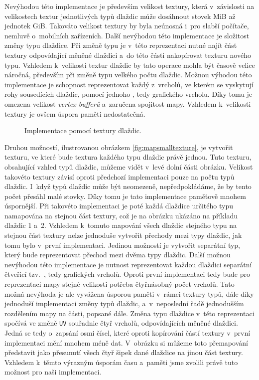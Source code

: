Nevýhodou této implementace je především velikost textury, která v~závislosti na velikostech textur jednotlivých typů dlaždic může dosáhnout stovek MiB až jednotek GiB. Takováto velikost textury by byla neúnosná i~pro slabší počítače, nemluvě o~mobilních zařízeních. Další nevýhodou této implementace je složitost změny typu dlaždice. Při změně typu je v~této reprezentaci nutné najít část textury odpovídající měněné dlaždici a~do této části nakopírovat texturu nového typu. Vzhledem k~velikosti textur dlaždic by tato operace mohla být časově velice náročná, především při změně typu velkého počtu dlaždic. Možnou výhodou této implementace je schopnost reprezentovat každý z~vrcholů, ve kterém se vyskytují rohy sousedících dlaždic, pomocí jednoho , tedy grafického vrcholu. Díky tomu je omezena velikost \textit{vertex bufferů} a~zaručena spojitost mapy. Vzhledem k~velikosti textury je ovšem úspora paměti nedostatečná.

\begin{figure}[h]
	\centering
	
	\caption{Implementace pomocí textury dlaždic.}
	\label{fig:mapbigtexture}
\end{figure}

Druhou možností, ilustrovanou obrázkem \ref{fig:mapsmalltexture}, je vytvořit texturu, ve které bude textura každého typu dlaždic právě jednou. Tuto texturu, obsahující vzhled typů dlaždic, můžeme vidět v~levé dolní části obrázku. Velikost takovéto textury závisí oproti předchozí implementaci pouze na počtu typů dlaždic. I~když typů dlaždic může být neomezeně, nepředpokládáme, že by tento počet přesáhl malé stovky. Díky tomu je tato implementace paměťově mnohem úspornější. Při takovéto implementaci je poté každá dlaždice určitého typu namapována na stejnou část textury, což je na obrázku ukázáno na příkladu dlaždic 1 a~2. Vzhledem k~tomuto mapování všech dlaždic stejného typu na stejnou část textury nelze jednoduše vytvořit přechody mezi typy dlaždic, jak tomu bylo v~první implementaci. Jedinou možností je vytvořit separátní typ, který bude reprezentovat přechod mezi dvěma typy dlaždic. Další možnou nevýhodou této implementace je nutnost reprezentovat každou dlaždici separátní čtveřicí tzv.~, tedy grafických vrcholů. Oproti první implementaci tedy bude pro reprezentaci mapy stejné velikosti potřeba čtyřnásobný počet vrcholů. Tato možná nevýhoda je ale vyvážena úsporou paměti v~rámci textury typů, dále díky jednoduší implementaci změny typů dlaždic, a~v~neposlední řadě jednodušším rozdělením mapy na části, popsané dále. Změna typu dlaždice v~této reprezentaci spočívá ve změně \texttt{UV} souřadnic čtyř vrcholů, odpovídajících měněné dlaždici. Jedná se tedy o~zapsání osmi čísel, které oproti kopírování částí textury v~první implementaci mění mnohem méně dat. V~obrázku si můžeme toto přemapování představit jako přesunutí všech čtyř šipek dané dlaždice na jinou část textury. Vzhledem k~těmto výrazným úsporám času a~paměti jsme zvolili právě tuto možnost pro naši implementaci.

